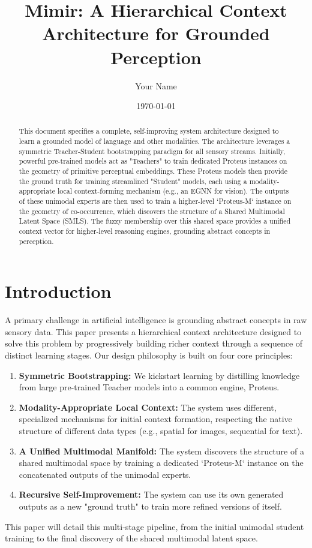 \documentclass{article}
\title{Mimir: A Hierarchical Context Architecture for Grounded Perception}
\author{Your Name}
\date{\today}
\begin{document}
\maketitle

\begin{abstract}
This document specifies a complete, self-improving system architecture designed to learn a grounded model of language and other modalities. The architecture leverages a symmetric Teacher-Student bootstrapping paradigm for all sensory streams. Initially, powerful pre-trained models act as "Teachers" to train dedicated Proteus instances on the geometry of primitive perceptual embeddings. These Proteus models then provide the ground truth for training streamlined "Student" models, each using a modality-appropriate local context-forming mechanism (e.g., an EGNN for vision). The outputs of these unimodal experts are then used to train a higher-level `Proteus-M` instance on the geometry of co-occurrence, which discovers the structure of a Shared Multimodal Latent Space (SMLS). The fuzzy membership over this shared space provides a unified context vector for higher-level reasoning engines, grounding abstract concepts in perception.
\end{abstract}

\section{Introduction}

A primary challenge in artificial intelligence is grounding abstract concepts in raw sensory data. This paper presents a hierarchical context architecture designed to solve this problem by progressively building richer context through a sequence of distinct learning stages. Our design philosophy is built on four core principles:
\begin{enumerate}
    \item \textbf{Symmetric Bootstrapping:} We kickstart learning by distilling knowledge from large pre-trained Teacher models into a common engine, Proteus.
    \item \textbf{Modality-Appropriate Local Context:} The system uses different, specialized mechanisms for initial context formation, respecting the native structure of different data types (e.g., spatial for images, sequential for text).
    \item \textbf{A Unified Multimodal Manifold:} The system discovers the structure of a shared multimodal space by training a dedicated `Proteus-M` instance on the concatenated outputs of the unimodal experts.
    \item \textbf{Recursive Self-Improvement:} The system can use its own generated outputs as a new "ground truth" to train more refined versions of itself.
\end{enumerate}
This paper will detail this multi-stage pipeline, from the initial unimodal student training to the final discovery of the shared multimodal latent space.
\end{document}
